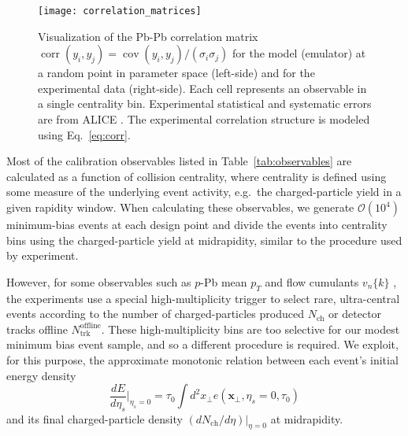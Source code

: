 \documentclass[aps,prc,reprint,amsmath,nofootinbib]{revtex4-1}
\newcommand{\nch}{N_\text{ch}}
\newcommand{\ntrk}{N_\text{trk}^\text{offline}}
\newcommand{\vnk}[2]{v_#1\{#2\}}
\newcommand{\xv}{\mathbf x}
\newcommand{\order}[1]{$\mathcal O(10^{#1})$}
\DeclareMathOperator{\cov}{cov}
\DeclareMathOperator{\corr}{corr}
\begin{document}
\begin{figure}[t]
  \texttt{[image: correlation\_matrices]}
  \caption{
    \label{fig:correlation}
    Visualization of the Pb-Pb correlation matrix $\corr(y_i, y_j) = \cov(y_i,y_j)/(\sigma_i \sigma_j)$ for the model (emulator) at a random point in parameter space (left-side) and for the experimental data (right-side).
    Each cell represents an observable in a single centrality bin. Experimental statistical and systematic errors are from ALICE \cite{Adam:2015ptt, Adam:2016izf}.
    The experimental correlation structure is modeled using Eq.~\eqref{eq:corr}.
  }
\end{figure}

Most of the calibration observables listed in Table~\ref{tab:observables} are calculated as a function of collision centrality, where centrality is defined using some measure of the underlying event activity, e.g.\ the charged-particle yield in a given rapidity window.
When calculating these observables, we generate \order{4} minimum-bias events at each design point and divide the events into centrality bins using the charged-particle yield at midrapidity, similar to the procedure used by experiment.

However, for some observables such as $p$-Pb mean $p_T$ \cite{Abelev:2013bla} and flow cumulants $\vnk{n}{k}$ \cite{Chatrchyan:2013nka}, the experiments use a special high-multiplicity trigger to select rare, ultra-central events according to the number of charged-particles produced $\nch$ or detector tracks offline $\ntrk$.
These high-multiplicity bins are too selective for our modest minimum bias event sample, and so a different procedure is required.
We exploit, for this purpose, the approximate monotonic relation between each event's initial energy density
\begin{equation}
  \frac{dE}{d\eta_s} \bigg\vert_{\eta_s=0} = \tau_0 \int d^2x_\perp e(\xv_\perp, \eta_s=0, \tau_0)
\end{equation}
and its final charged-particle density $(d\nch/d\eta) \vert_{\eta=0}$ at midrapidity.
\end{document}
